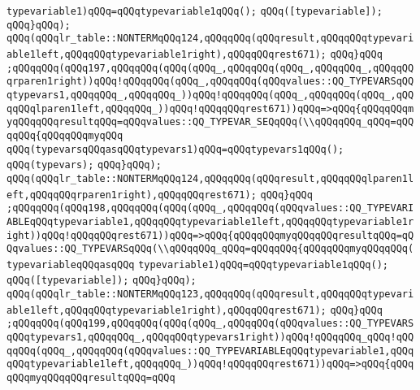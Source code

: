 \verb|typevariable1)qQQq=qQQqtypevariable1qQQq();|\newline
\verb|qQQq([typevariable]);|\newline
\verb|qQQq}qQQq);|\newline
\verb|qQQq(qQQqlr_table::NONTERMqQQq124,qQQqqQQq(qQQqresult,qQQqqQQqtypevariable1left,qQQqqQQqtypevariable1right),qQQqqQQqrest671);|\newline
\verb|qQQq}qQQq|\newline
\verb|;qQQqqQQq(qQQq197,qQQqqQQq(qQQq(qQQq_,qQQqqQQq(qQQq_,qQQqqQQq_,qQQqqQQqrparen1right))qQQq!qQQqqQQq(qQQq_,qQQqqQQq(qQQqvalues::QQ_TYPEVARSqQQqtypevars1,qQQqqQQq_,qQQqqQQq_))qQQq!qQQqqQQq(qQQq_,qQQqqQQq(qQQq_,qQQqqQQqlparen1left,qQQqqQQq_))qQQq!qQQqqQQqrest671))qQQq=>qQQq{qQQqqQQqmyqQQqqQQqresultqQQq=qQQqvalues::QQ_TYPEVAR_SEQqQQq(\\qQQqqQQq_qQQq=qQQqqQQq{qQQqqQQqmyqQQq|\newline
\verb|qQQq(typevarsqQQqasqQQqtypevars1)qQQq=qQQqtypevars1qQQq();|\newline
\verb|qQQq(typevars);|\newline
\verb|qQQq}qQQq);|\newline
\verb|qQQq(qQQqlr_table::NONTERMqQQq124,qQQqqQQq(qQQqresult,qQQqqQQqlparen1left,qQQqqQQqrparen1right),qQQqqQQqrest671);|\newline
\verb|qQQq}qQQq|\newline
\verb|;qQQqqQQq(qQQq198,qQQqqQQq(qQQq(qQQq_,qQQqqQQq(qQQqvalues::QQ_TYPEVARIABLEqQQqtypevariable1,qQQqqQQqtypevariable1left,qQQqqQQqtypevariable1right))qQQq!qQQqqQQqrest671))qQQq=>qQQq{qQQqqQQqmyqQQqqQQqresultqQQq=qQQqvalues::QQ_TYPEVARSqQQq(\\qQQqqQQq_qQQq=qQQqqQQq{qQQqqQQqmyqQQqqQQq(typevariableqQQqasqQQq|\newline
\verb|typevariable1)qQQq=qQQqtypevariable1qQQq();|\newline
\verb|qQQq([typevariable]);|\newline
\verb|qQQq}qQQq);|\newline
\verb|qQQq(qQQqlr_table::NONTERMqQQq123,qQQqqQQq(qQQqresult,qQQqqQQqtypevariable1left,qQQqqQQqtypevariable1right),qQQqqQQqrest671);|\newline
\verb|qQQq}qQQq|\newline
\verb|;qQQqqQQq(qQQq199,qQQqqQQq(qQQq(qQQq_,qQQqqQQq(qQQqvalues::QQ_TYPEVARSqQQqtypevars1,qQQqqQQq_,qQQqqQQqtypevars1right))qQQq!qQQqqQQq_qQQq!qQQqqQQq(qQQq_,qQQqqQQq(qQQqvalues::QQ_TYPEVARIABLEqQQqtypevariable1,qQQqqQQqtypevariable1left,qQQqqQQq_))qQQq!qQQqqQQqrest671))qQQq=>qQQq{qQQqqQQqmyqQQqqQQqresultqQQq=qQQq|\newline
